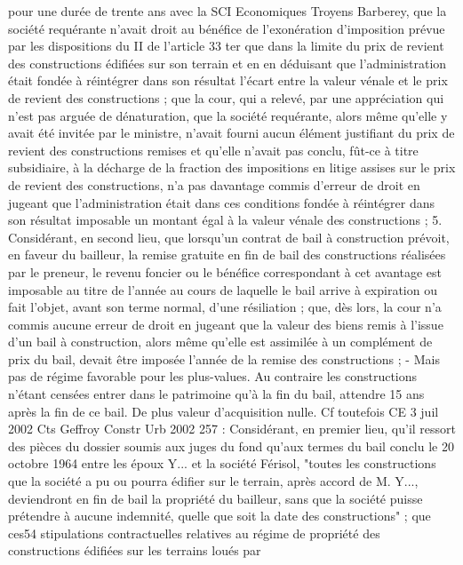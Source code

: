 \documentclass[11pt,a4paper]{report}
\begin{document}
	pour une durée de trente ans avec la SCI Economiques Troyens Barberey, que la société requérante n'avait droit
	au bénéfice de l'exonération d'imposition prévue par les dispositions du II de l'article 33 ter que dans la limite
	du prix de revient des constructions édifiées sur son terrain et en en déduisant que l'administration était fondée à
	réintégrer dans son résultat l'écart entre la valeur vénale et le prix de revient des constructions ; que la cour, qui
	a relevé, par une appréciation qui n'est pas arguée de dénaturation, que la société requérante, alors même
	qu'elle y avait été invitée par le ministre, n'avait fourni aucun élément justifiant du prix de revient des
	constructions remises et qu'elle n'avait pas conclu, fût-ce à titre subsidiaire, à la décharge de la fraction des
	impositions en litige assises sur le prix de revient des constructions, n'a pas davantage commis d'erreur de droit
	en jugeant que l'administration était dans ces conditions fondée à réintégrer dans son résultat imposable un
	montant égal à la valeur vénale des constructions ;
	5. Considérant, en second lieu, que lorsqu'un contrat de bail à construction prévoit, en faveur du bailleur, la
	remise gratuite en fin de bail des constructions réalisées par le preneur, le revenu foncier ou le bénéfice
	correspondant à cet avantage est imposable au titre de l'année au cours de laquelle le bail arrive à expiration ou
	fait l'objet, avant son terme normal, d'une résiliation ; que, dès lors, la cour n'a commis aucune erreur de droit
	en jugeant que la valeur des biens remis à l'issue d'un bail à construction, alors même qu'elle est assimilée à un
	complément de prix du bail, devait être imposée l'année de la remise des constructions ;
	- Mais pas de régime favorable pour les plus-values.
	Au contraire les constructions n’étant censées entrer dans le patrimoine qu’à la fin du bail, attendre 15 ans après
	la fin de ce bail. De plus valeur d’acquisition nulle.
	Cf toutefois CE 3 juil 2002 Cts Geffroy Constr Urb 2002 257 :
	Considérant, en premier lieu, qu'il ressort des pièces du dossier soumis aux juges du fond qu'aux termes du bail
	conclu le 20 octobre 1964 entre les époux Y... et la société Férisol, "toutes les constructions que la société a pu
	ou pourra édifier sur le terrain, après accord de M. Y..., deviendront en fin de bail la propriété du bailleur, sans
	que la société puisse prétendre à aucune indemnité, quelle que soit la date des constructions" ; que ces54
	stipulations contractuelles relatives au régime de propriété des constructions édifiées sur les terrains loués par
\end{document}
